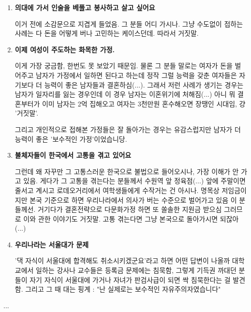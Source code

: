 \begin{enumerate}
    \item \textbf{ 의대에 가서 인술을 베풀고 봉사하고 살고 싶어요}
    \vspace{5mm}

    이거 전에 소감문으로 지겹게 들었음.
    그 분들 어디 가시나. 그냥 수도없이 접하는 사례는 다 돈을 어떻게 버나 고민하는 케이스던데.
    따라서 거짓말.
    \vspace{5mm}

    \item \textbf{ 이제 여성이 주도하는 화목한 가정.}
    \vspace{5mm}

    이게 가장 궁금함,  한번도 못 보았기 때문임.
    물론 그 분들 말로는 여자가 돈을 벌어주고 남자가 가정에서 일하면 된다고 하는데
    정작 그럴 능력을 갖춘 여자들은 자기보다 더 능력이 좋은 남자들과 결혼하심(...).
    그래서 저런 사례가 생기는 경우는 남자가 일자리를 잃는 경우인데 이 경우 남자는 이혼위기에 처해짐(...)
    아니 뭐 결혼부터가 이미 남자는 2억 집해오고 여자는 3천만원 혼수해오면 장땡인 시대임, 걍 '거짓말'.
    \vspace{5mm}

    그리고 개인적으로 접해본 가정들은 잘 돌아가는 경우는 유감스럽지만 남자가 더 능력이 좋은 '보수적인 가정'이었습니당.
    \vspace{5mm}

    \item \textbf{ 불체자들이 한국에서 고통을 겪고 있어요}
    \vspace{5mm}

    그런데 왜 자꾸만 그 고통스러운 한국으로 불법으로 들어오시나, 가장 이해가 안 가고 있음.
    게다가 그 고통을 겪는다는 분들께서 수원역 앞 정육점(...) 앞에 주말이면 줄서고 계시고
    로데오거리에서 여학생들에게 수작거는 건 아시나.
    명목상 저임금이지만 본국 기준으로 하면 우리나라에서 의사가 버는 수준으로 벌어가고 있음 이 분들께선.
    거기다가 결혼전략으로 다문화가정 하면 또 쏠솔한 지원금 받으심
    그러므로 이와 관한 이야기도 거짓말. 고통 겪는다면 그냥 본국으로 돌아가시면 되잖아(...)
    \vspace{5mm}

    \item \textbf{ 우리나라는 서울대가 문제}
    \vspace{5mm}

    '댁 자식이 서울대에 합격해도 취소시키겠군요'라고 하면 어떤 답변이 나올까
    대학교에서 일하는 강사나 교수들은 등록금 문제에는 침묵함,
    그렇게 기득권 까대던 분들이 자기 자식이 서울대에 가거나 자녀가 판검사급이 되면 싹 침묵한다는 걸 발견함.
    그리고 그 때 대는 핑계 : "난 실제로는 보수적인 자유주의자였습니다"
    \vspace{5mm}
\end{enumerate}
...
\vspace{5mm}

